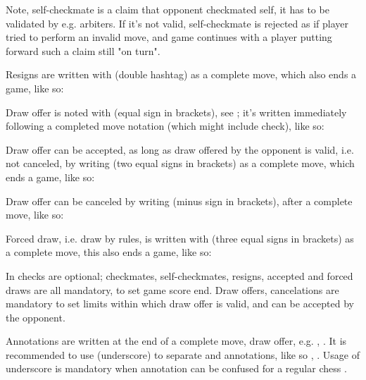 \algcycpar
{}
\algcycparend

Note, self-checkmate is a claim that opponent checkmated self, it has to be validated
by e.g. arbiters. If it's not valid, self-checkmate is rejected as if player tried to
perform an invalid move, and game continues with a player putting forward such a claim
still "on turn".

Resigns are written with \alg{\#\#} (double hashtag) as a complete move, which also
ends a game, like so:

\algcycpar
{}
\algcycparend

Draw offer is noted with \alg{(=)} (equal sign in brackets), see ;
it's written immediately following a completed move notation (which might include check),
like so:

\algcycpar
{}
\algcycparend

Draw offer can be accepted, as long as draw offered by the opponent is valid, i.e. not
canceled, by writing \alg{(==)} (two equal signs in brackets) as a complete move, which
ends a game, like so:

\algcycpar
{}
\algcycparend

Draw offer can be canceled by writing \alg{(-)} (minus sign in brackets), after a complete
move, like so:

\algcycpar
{}
\algcycparend

Forced draw, i.e. draw by rules, is written with \alg{(===)} (three equal signs in
brackets) as a complete move, this also ends a game, like so:

\algcycpar
{}
\algcycparend

In  checks are optional; checkmates, self-checkmates, resigns, accepted
and forced draws are all mandatory, to set game score end. Draw offers, cancelations
are mandatory to set limits within which draw offer is valid, and can be accepted by
the opponent.

Annotations are written at the end of a complete move, draw offer, e.g. ,
. It is recommended to use \alg{\_} (underscore) to separate 
and annotations, like so , . Usage of underscore is
mandatory when annotation can be confused for a regular chess .

